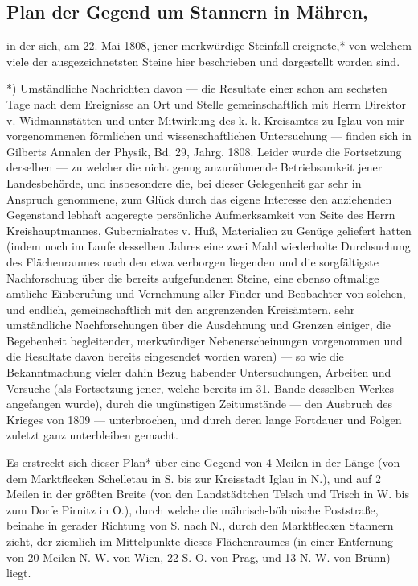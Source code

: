 \documentclass[a4paper, 11pt, oneside, german]{article}
\begin{document}
\subsection[Plan der Gegend um Stannern in Mähren.]{Plan der Gegend um Stannern in Mähren,}

in der sich, am 22. Mai 1808, jener merkwürdige Steinfall ereignete,* von welchem viele der ausgezeichnetsten Steine hier beschrieben und dargestellt worden sind.

*) Umständliche Nachrichten davon --- die Resultate einer schon am sechsten Tage nach dem Ereignisse an Ort und Stelle gemeinschaftlich mit Herrn Direktor v. Widmannstätten und unter Mitwirkung des k. k. Kreisamtes zu Iglau von mir vorgenommenen förmlichen und wissenschaftlichen Untersuchung --- finden sich in Gilberts Annalen der Physik, Bd. 29, Jahrg. 1808. Leider wurde die Fortsetzung derselben --- zu welcher die nicht genug anzurühmende Betriebsamkeit jener Landesbehörde, und insbesondere die, bei dieser Gelegenheit gar sehr in Anspruch genommene, zum Glück durch das eigene Interesse den anziehenden Gegenstand lebhaft angeregte persönliche Aufmerksamkeit von Seite des Herrn Kreishauptmannes, Gubernialrates v. Huß, Materialien zu Genüge geliefert hatten (indem noch im Laufe desselben Jahres eine zwei Mahl wiederholte Durchsuchung des Flächenraumes nach den etwa verborgen liegenden und die sorgfältigste Nachforschung über die bereits aufgefundenen Steine, eine ebenso oftmalige amtliche Einberufung und Vernehmung aller Finder und Beobachter von solchen, und endlich, gemeinschaftlich mit den angrenzenden Kreisämtern, sehr umständliche Nachforschungen über die Ausdehnung und Grenzen einiger, die Begebenheit begleitender, merkwürdiger Nebenerscheinungen vorgenommen und die Resultate davon bereits eingesendet worden waren) --- so wie die Bekanntmachung vieler dahin Bezug habender Untersuchungen, Arbeiten und Versuche (als Fortsetzung jener, welche bereits im 31. Bande desselben Werkes angefangen wurde), durch die ungünstigen Zeitumstände --- den Ausbruch des Krieges von 1809 --- unterbrochen, und durch deren lange Fortdauer und Folgen zuletzt ganz unterbleiben gemacht.

Es erstreckt sich dieser Plan* über eine Gegend von 4 Meilen in der Länge (von dem Marktflecken Schelletau in S. bis zur Kreisstadt Iglau in N.), und auf 2 Meilen in der größten Breite (von den Landstädtchen Telsch und Trisch in W. bis zum Dorfe Pirnitz in O.), durch welche die mährisch-böhmische Poststraße, beinahe in gerader Richtung von S. nach N., durch den Marktflecken Stannern zieht, der ziemlich im Mittelpunkte dieses Flächenraumes (in einer Entfernung von 20 Meilen N. W. von Wien, 22 S. O. von Prag, und 13 N. W. von Brünn) liegt.
\end{document}
